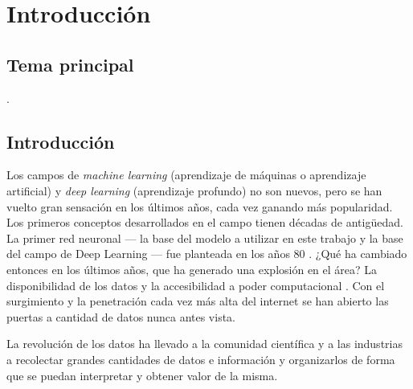 
\chapter{Introducción} %

\label{Chapter1} %


\newcommand{\keyword}[1]{\textbf{#1}}
\newcommand{\tabhead}[1]{\textbf{#1}}
\newcommand{\code}[1]{\texttt{#1}}
\newcommand{\file}[1]{\texttt{\bfseries#1}}
\newcommand{\option}[1]{\texttt{\itshape#1}}


\section{Tema principal}

\ttitle.



\section{Introducción}

Los campos de \emph{\gls{machine learning}} (aprendizaje de máquinas o aprendizaje artificial) y \textit{\gls{deep learning}} (\gls{aprendizaje profundo}) \parencite{lecun2015deep} no son nuevos, pero se han vuelto gran sensación en los últimos años, cada vez ganando más popularidad. Los primeros conceptos desarrollados en el campo tienen décadas de antigüedad. La primer \gls{red neuronal} --- la base del modelo a utilizar en este trabajo y la base del campo de Deep Learning --- fue planteada en los años 80 \parencite{werbos1982applications}. ¿Qué ha cambiado entonces en los últimos años, que ha generado una explosión en el área? La disponibilidad de los datos y la accesibilidad a poder computacional \parencite{jordan2015machine}. Con el surgimiento y la penetración cada vez más alta del internet se han abierto las puertas a cantidad de datos nunca antes vista.

La revolución de los datos ha llevado a la comunidad científica y a las industrias a recolectar grandes cantidades de datos e información y organizarlos de forma que se puedan interpretar y obtener valor de la misma.

